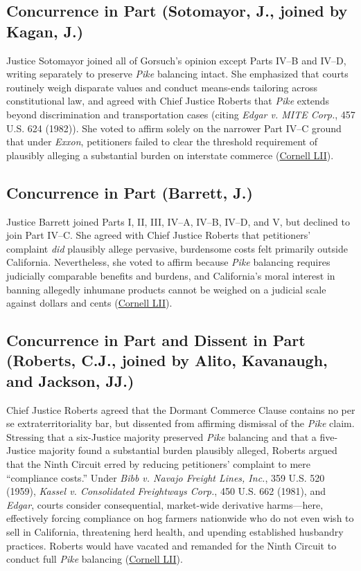 \documentclass[12pt]{article}
\begin{document}
\subsection{Concurrence in Part (Sotomayor, J., joined by Kagan, J.)}
Justice Sotomayor joined all of Gorsuch's opinion except Parts IV--B and IV--D, writing separately to preserve \textit{Pike} balancing intact. She emphasized that courts routinely weigh disparate values and conduct means-ends tailoring across constitutional law, and agreed with Chief Justice Roberts that \textit{Pike} extends beyond discrimination and transportation cases (citing \textit{Edgar v. MITE Corp.}, 457 U.S. 624 (1982)). She voted to affirm solely on the narrower Part IV--C ground that under \textit{Exxon}, petitioners failed to clear the threshold requirement of plausibly alleging a substantial burden on interstate commerce (\href{https://www.law.cornell.edu/supremecourt/text/21-468}{Cornell LII}).

\subsection{Concurrence in Part (Barrett, J.)}
Justice Barrett joined Parts I, II, III, IV--A, IV--B, IV--D, and V, but declined to join Part IV--C. She agreed with Chief Justice Roberts that petitioners' complaint \textit{did} plausibly allege pervasive, burdensome costs felt primarily outside California. Nevertheless, she voted to affirm because \textit{Pike} balancing requires judicially comparable benefits and burdens, and California's moral interest in banning allegedly inhumane products cannot be weighed on a judicial scale against dollars and cents (\href{https://www.law.cornell.edu/supremecourt/text/21-468}{Cornell LII}).

\subsection{Concurrence in Part and Dissent in Part (Roberts, C.J., joined by Alito, Kavanaugh, and Jackson, JJ.)}
Chief Justice Roberts agreed that the Dormant Commerce Clause contains no per se extraterritoriality bar, but dissented from affirming dismissal of the \textit{Pike} claim. Stressing that a six-Justice majority preserved \textit{Pike} balancing and that a five-Justice majority found a substantial burden plausibly alleged, Roberts argued that the Ninth Circuit erred by reducing petitioners' complaint to mere ``compliance costs.'' Under \textit{Bibb v. Navajo Freight Lines, Inc.}, 359 U.S. 520 (1959), \textit{Kassel v. Consolidated Freightways Corp.}, 450 U.S. 662 (1981), and \textit{Edgar}, courts consider consequential, market-wide derivative harms---here, effectively forcing compliance on hog farmers nationwide who do not even wish to sell in California, threatening herd health, and upending established husbandry practices. Roberts would have vacated and remanded for the Ninth Circuit to conduct full \textit{Pike} balancing (\href{https://www.law.cornell.edu/supremecourt/text/21-468}{Cornell LII}).
\end{document}
